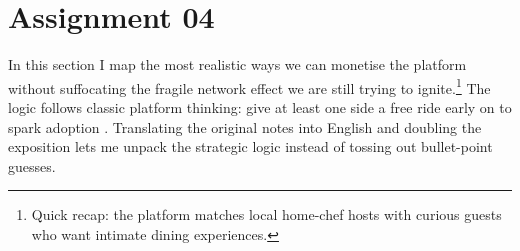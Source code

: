 \section*{Assignment 04}

In this section I map the most realistic ways we can monetise the platform without suffocating the fragile network effect we are still trying to ignite.\footnote{Quick recap: the platform matches local home-chef hosts with curious guests who want intimate dining experiences.} The logic follows classic platform thinking: give at least one side a free ride early on to spark adoption \citep{Choudary2016}. Translating the original notes into English and doubling the exposition lets me unpack the strategic logic instead of tossing out bullet-point guesses.


